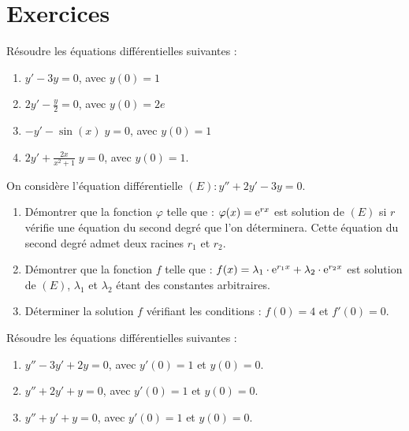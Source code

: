 \TCDLessonStyleOff
\clearpage
\section{Exercices}
\begin{exo}
R\'esoudre les \'equations diff\'erentielles suivantes : 
\begin{enumerate}
\item $y' - 3 y = 0$, avec $y(0) = 1$
\item $2 y' - \frac{y}{2} = 0$, avec $y(0) = 2 e$
\item $ - y' - \sin(x) \; y = 0$, avec $y(0) = 1$
\item $2 y' + \frac{2x}{x^2 + 1} \; y = 0$, avec $y(0) = 1$.
\end{enumerate}
\end{exo}

\begin{exo}
      On consid\`ere l'\'equation diff\'erentielle $(E) : y''+2y'-3y=0$.
      \begin{enumerate}
            \item D\'emontrer que la fonction $\varphi$ telle que : $\varphi (x) = \mathrm{e}^{rx}$ est solution de $(E)$
                  si $r$ v\'erifie une \'equation du second degr\'e que l'on d\'eterminera.
                  Cette \'equation du second degr\'e admet deux racines $r_1$ et $r_2$.
            \item D\'emontrer que la fonction $f$ telle que : 
                  $f(x) = \lambda_1 \cdot \mathrm{e}^{r_1 x} + \lambda_2 \cdot \mathrm{e}^{r_2 x}$ est solution de $(E)$,
                  $\lambda_1$ et $\lambda_2$ \'etant des constantes arbitraires.
            \item D\'eterminer la solution $f$ v\'erifiant les conditions : $f(0) = 4$ et $f'(0) = 0$.
      \end{enumerate}
\end{exo}

\begin{exo}
R\'esoudre les \'equations diff\'erentielles suivantes : 
\begin{enumerate}
\item $y'' - 3 y' + 2y = 0$, avec $y'(0) = 1$ et $y(0) = 0$.
\item $y'' + 2 y' + y = 0$, avec $y'(0) = 1$ et $y(0) = 0$.
\item $y'' + y' + y = 0$, avec $y'(0) = 1$ et $y(0) = 0$.
\end{enumerate}
\end{exo}

